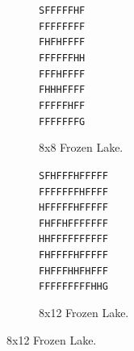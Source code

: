             \begin{figure}
                \centering
                \begin{subfigure}[b]{0.3\textwidth}
                    \centering
                    \texttt{SFFFFFHF} \\
                    \texttt{FFFFFFFF} \\
                    \texttt{FHFHFFFF} \\
                    \texttt{FFFFFFHH} \\
                    \texttt{FFFHFFFF} \\
                    \texttt{FHHHFFFF} \\
                    \texttt{FFFFFHFF} \\
                    \texttt{FFFFFFFG} 
                    \caption{8x8 Frozen Lake.}
                    \label{fig:fl8}
                \end{subfigure}
                \begin{subfigure}[b]{0.3\textwidth}
                    \centering
                    \texttt{SFHFFFHFFFFF} \\
                    \texttt{FFFFFFFHFFFF} \\
                    \texttt{HFFFFFHFFFFF} \\
                    \texttt{FHFFHFFFFFFF} \\
                    \texttt{HHFFFFFFFFFF} \\
                    \texttt{FHFFFFHFFFFF} \\
                    \texttt{FHFFFHHFHFFF} \\
                    \texttt{FFFFFFFFFHHG} 
                    \caption{8x12 Frozen Lake.}
                    \label{fig:fl12}
                \end{subfigure}

\end{figure}
